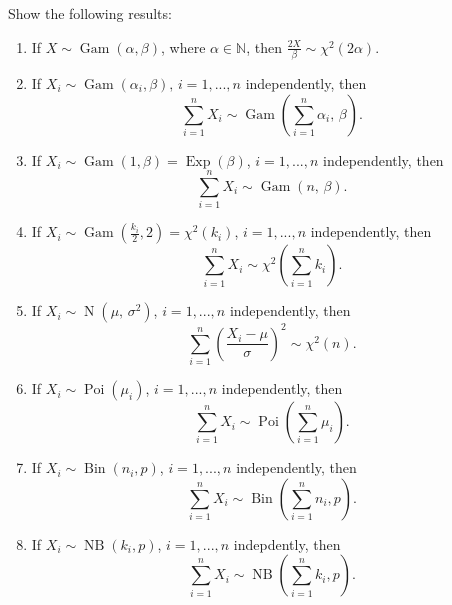 \documentclass[notoc,notitlepage]{tufte-book}
\DeclareMathOperator{\Bin}{Bin }
\DeclareMathOperator{\Poi}{Poi }
\DeclareMathOperator{\NB}{NB }
\DeclareMathOperator{\Exp}{Exp }
\DeclareMathOperator{\Nor}{N }
\DeclareMathOperator{\Gam}{Gam }
\begin{document}
\begin{ex}
  Show the following results:
  \begin{enumerate}
    \item If $X \sim \Gam(\alpha, \beta)$, where $\alpha \in \mathbb{N}$, then $\frac{2X}{\beta} \sim \chi^2 (2 \alpha)$.
    \item If $X_i \sim \Gam(\alpha_i, \beta), \, i = 1, ..., n$ independently, then
      \begin{equation*}
        \sum_{i=1}^{n} X_i \sim \Gam\left( \sum_{i=1}^{n} \alpha_i, \, \beta \right).
      \end{equation*}
    \item If $X_i \sim \Gam(1, \beta) = \Exp(\beta)$, $i = 1, ..., n$ independently, then
      \begin{equation*}
        \sum_{i=1}^{n} X_i  \sim \Gam(n, \, \beta).
      \end{equation*}
    \item If $X_i \sim \Gam\left( \frac{k_i}{2}, 2 \right) = \chi^2 ( k_i )$, $i = 1, ..., n$ independently, then
      \begin{equation*}
        \sum_{i=1}^{n} X_i \sim \chi^2 \left( \sum_{i=1}^{n} k_i \right).
      \end{equation*}
    \item If $X_i \sim \Nor( \mu, \, \sigma^2 )$, $i = 1, ..., n$ independently, then
      \begin{equation*}
        \sum_{i=1}^{n} \left( \frac{X_i - \mu}{\sigma} \right)^2 \sim \chi^2(n).
      \end{equation*}
    \item If $X_i \sim \Poi(\mu_i)$, $i = 1, ..., n$ independently, then
      \begin{equation*}
        \sum_{i=1}^{n} X_i \sim \Poi\left( \sum_{i=1}^{n} \mu_i \right).
      \end{equation*}
    \item If $X_i \sim \Bin(n_i, p)$, $i = 1, ..., n$ independently, then
      \begin{equation*}
        \sum_{i=1}^{n} X_i \sim \Bin\left( \sum_{i=1}^{n} n_i, p \right).
      \end{equation*}
    \item If $X_i \sim \NB(k_i, p)$, $i = 1, ..., n$ indepdently, then
      \begin{equation*}
        \sum_{i=1}^{n} X_i \sim \NB\left( \sum_{i=1}^{n} k_i, p \right).
      \end{equation*}
  \end{enumerate}
\end{ex}
\end{document}
